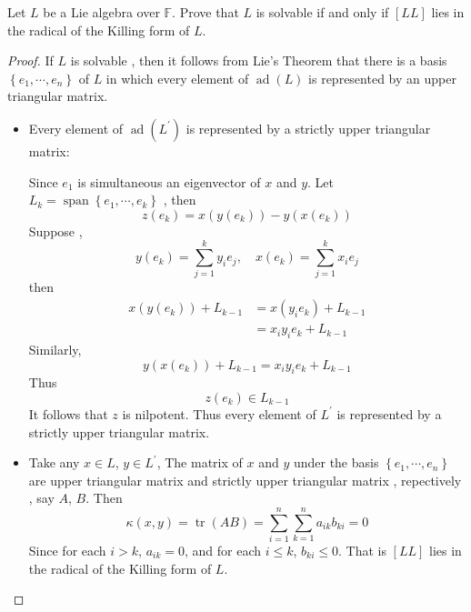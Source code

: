 \documentclass[../main.tex]{subfiles}
\begin{document}
\begin{exercise}{}{}
Let $L$ be a Lie algebra over $\mathbb{F}$. Prove that $L$ is solvable if and only if $[LL]$ lies in the radical of the Killing form of $L$.
\end{exercise}
\begin{proof}
If \(  L   \) is solvable , then it follows from Lie's Theorem that there is a basis \(  \left\{ e_1,\cdots ,e_{n} \right\}  \) of \(  L  \) in which every element of \(  \operatorname{ad}\left( L \right)   \) is represented by an upper triangular matrix. 

\begin{itemize}
    \item Every element of \(  \operatorname{ad}\left( L^{\prime}  \right)   \)  is represented by a strictly upper triangular matrix: 
    

    Since \(  e_1  \) is simultaneous an eigenvector of \( x   \) and \(  y  \). Let \(  L_{k}= \operatorname{span}\left\{ e_1,\cdots ,e_{k} \right\}  \) , then \[
  z\left( e_{k} \right)= x\left( y\left( e_{k} \right)  \right)-y\left( x\left( e_{k} \right)  \right)   
    \]    Suppose , \[
    y\left( e_{k} \right)= \sum _{j= 1}^{k}y_{i}e_{j},\quad x\left( e_{k} \right)= \sum _{j= 1}^{k}x_{i}e_{j}  
    \]then \[
  \begin{aligned}
    x\left( y\left( e_{k} \right)  \right)+ L_{k-1}&= x\left( y_{i}e_{k} \right)+L_{k-1} \\ 
     &= x_{i}y_{i}e_{k}+ L_{k-1}
  \end{aligned}  
    \] Similarly, \[
    y\left( x\left( e_{k} \right)  \right)+L_{k-1}= x_{i}y_{i}e_{k}+ L_{k-1}
    \]Thus \[
    z\left( e_{k} \right)\in L_{k-1}
    \]It follows that \(  z  \) is  nilpotent. Thus every element of \(  L^{\prime}   \) is represented by a strictly upper triangular matrix.
    \item Take any \(  x \in L  \), \(  y \in L^{\prime}   \), The matrix of \(  x  \) and \(  y  \) under the basis \(  \left\{  e_1,\cdots,e_n  \right\}  \) are upper triangular matrix and strictly upper triangular matrix , repectively  , say \(  A  \), \(  B  \). Then \[
    \kappa \left( x,y \right) = \operatorname{tr}\left( AB \right)=\sum _{i= 1}^{n} \sum _{k= 1}^{n}a_{ik}b_{ki}= 0 
    \] Since for each \(  i> k  \), \(  a_{ik}= 0  \), and for each \(  i\le k  \), \(  b_{ki}\le 0  \). That is \(  \left[ LL \right]   \)         lies in the radical of the Killing form of \(  L  \). 
\end{itemize}



\end{proof}
\end{document}
